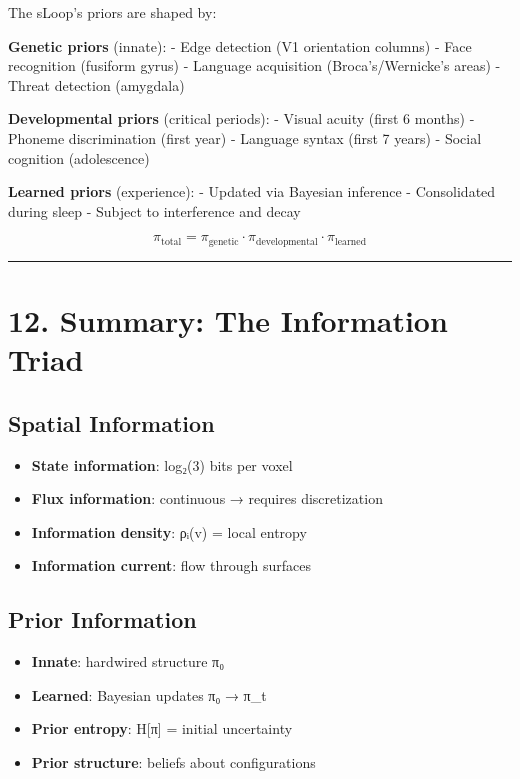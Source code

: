 \documentclass[
  11pt,
  letterpaper,
  twoside,
  openany]{book}
\makeatletter
\providecommand{\tightlist}{%
  \setlength{\itemsep}{0pt}\setlength{\parskip}{0pt}}
\let\orig@section\section
\renewcommand{\section}{\needspace{8\baselineskip}\orig@section}
\let\orig@subsection\subsection
\renewcommand{\subsection}{\needspace{6\baselineskip}\orig@subsection}
\makeatother
\begin{document}
The sLoop's priors are shaped by:

\textbf{Genetic priors} (innate): - Edge detection (V1 orientation
columns) - Face recognition (fusiform gyrus) - Language acquisition
(Broca's/Wernicke's areas) - Threat detection (amygdala)

\textbf{Developmental priors} (critical periods): - Visual acuity (first
6 months) - Phoneme discrimination (first year) - Language syntax (first
7 years) - Social cognition (adolescence)

\textbf{Learned priors} (experience): - Updated via Bayesian inference -
Consolidated during sleep - Subject to interference and decay

\[\pi_{\text{total}} = \pi_{\text{genetic}} \cdot \pi_{\text{developmental}} \cdot \pi_{\text{learned}}\]

\begin{center}\rule{0.5\linewidth}{0.5pt}\end{center}

\section{12. Summary: The Information
Triad}\label{summary-the-information-triad}

\subsection{Spatial Information}\label{spatial-information}

\begin{itemize}
\tightlist
\item
  \textbf{State information}: log₂(3) bits per voxel
\item
  \textbf{Flux information}: continuous → requires discretization
\item
  \textbf{Information density}: ρᵢ(v) = local entropy
\item
  \textbf{Information current}: flow through surfaces
\end{itemize}

\subsection{Prior Information}\label{prior-information}

\begin{itemize}
\tightlist
\item
  \textbf{Innate}: hardwired structure π₀
\item
  \textbf{Learned}: Bayesian updates π₀ → π\_t
\item
  \textbf{Prior entropy}: H{[}π{]} = initial uncertainty
\item
  \textbf{Prior structure}: beliefs about configurations
\end{itemize}
\end{document}
